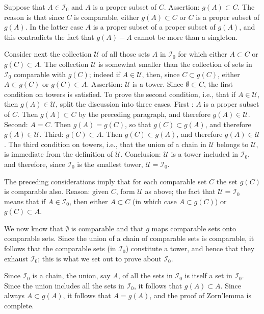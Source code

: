 Suppose that $A \in \mathcal{I}_{0}$ and $A$ is a proper subset of $C$. Assertion: $g(A) \subset C$. The reason is that since $C$ is comparable, either $g(A) \subset C$ or $C$ is a proper subset of $g(A)$. In the latter case $A$ is a proper subset of a proper subset of $g(A)$, and this contradicts the fact that $g(A) - A$ cannot be more than a singleton. 

Consider next the collection $\mathcal{U}$ of all those sets $A$ in $\mathcal{I}_{0}$ for which either $A \subset C$ or $g(C) \subset A$. The collection $\mathcal{U}$ is somewhat smaller than the collection of sets in $\mathcal{I}_{0}$ comparable with $g(C)$; indeed if $A \in \mathcal{U}$, then, since $C \subset g(C)$, either $A \subset g(C)$ or $g(C) \subset A$. Assertion: $\mathcal{U}$ is a tower. Since $\emptyset \subset C$, the first condition on towers is satisfied. To prove the second condition, i.e., that if $A \in \mathcal{U}$, then $g(A) \in \mathcal {U}$, split the discussion into three cases. First : $A$ is a proper subset of $C$. Then $g(A) \subset C$ by the preceding paragraph, and therefore $g(A) \in \mathcal{U}$. Second: $A = C$. Then $g(A) = g(C)$, so that $g(C) \subset g(A)$, and therefore $g(A) \in \mathcal{U}$. Third: $g(C) \subset A$. Then $g(C) \subset g(A)$, and therefore $g(A) \in \mathcal{U}$. The third condition on towers, i.e., that the union of a chain in $\mathcal{U}$ belongs to $\mathcal{U}$, is immediate from the definition of $\mathcal{U}$. Conclusion: $\mathcal{U}$ is a tower included in $\mathcal{I}_{0}$, and therefore, since $\mathcal{I}_{0}$ is the smallest tower, $\mathcal{U} = \mathcal{I}_{0}$. 

The preceding considerations imply that for each comparable set $C$ the set $g(C)$ is comparable also. Reason: given $C$, form $\mathcal{U}$ as above; the fact that $\mathcal{U} = \mathcal{I}_{0}$ means that if $A \in \mathcal{I}_{0}$, then either $A \subset C$ (in which case $A \subset g(C)$) or $g(C) \subset A$.

We now know that $\emptyset$ is comparable and that $g$ maps comparable sets onto comparable sets. Since the union of a chain of comparable sets is comparable, it follows that the comparable sets (in $\mathcal{I}_{0}$) constitute a tower, and hence that they exhaust $\mathcal{I}_{0}$; this is what we set out to prove about $\mathcal{I}_{0}$. 

Since $\mathcal{I}_{0}$ is a chain, the union, say $A$, of all the sets in $\mathcal{I}_{0}$ is itself a set in $\mathcal{I}_{0}$. Since the union includes all the sets in $\mathcal{I}_{0}$, it follows that $g(A) \subset A$. Since always $A \subset g(A)$, it follows that $A = g(A)$, and the proof of Zorn'lemma is complete.

